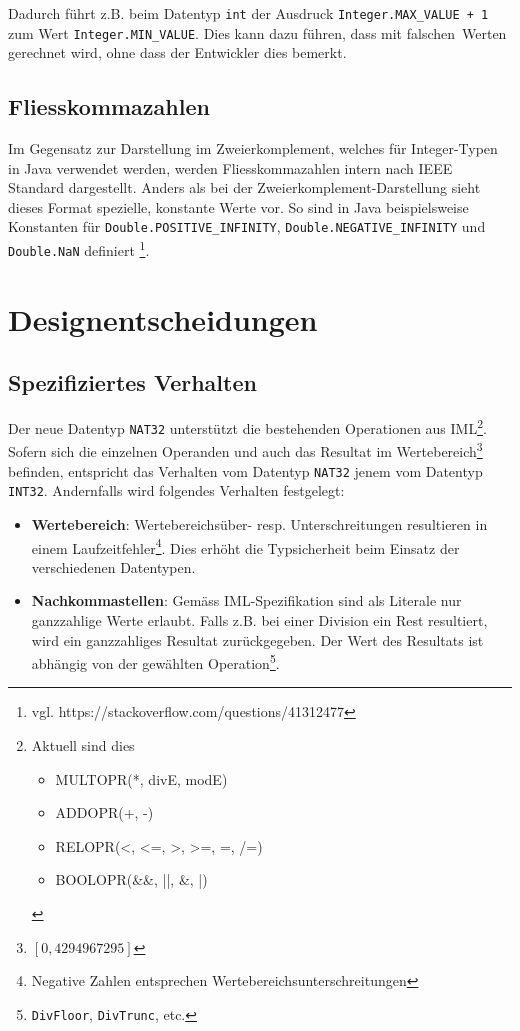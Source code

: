 \documentclass[10pt, a4paper, twocolumn]{article} %
\begin{document}
Dadurch führt z.B. beim Datentyp \texttt{int} der Ausdruck \texttt{Integer.MAX\_VALUE + 1} zum Wert \texttt{Integer.MIN\_VALUE}.
Dies kann dazu führen, dass mit \glqq falschen\grqq \ Werten gerechnet wird, ohne dass der Entwickler dies bemerkt.

\subsection{Fliesskommazahlen}
\label{ieee}
Im Gegensatz zur Darstellung im Zweierkomplement, welches für Integer-Typen in Java verwendet werden, werden Fliesskommazahlen intern nach IEEE Standard dargestellt.
Anders als bei der Zweierkomplement-Darstellung sieht dieses Format spezielle, konstante Werte vor.
So sind in Java beispielsweise Konstanten für \texttt{Double.POSITIVE\_INFINITY}, \texttt{Double.NEGATIVE\_INFINITY} und \texttt{Double.NaN} definiert \footnote{vgl. https://stackoverflow.com/questions/41312477}.

\section{Designentscheidungen}
\subsection{Spezifiziertes Verhalten}
Der neue Datentyp \texttt{NAT32} unterstützt die bestehenden Operationen aus IML\footnote{Aktuell sind dies \begin{itemize}
                                                                                                                \item MULTOPR(*, divE, modE) \item ADDOPR(+, -) \item RELOPR(<, <=, >, >=, =, /=) \item BOOLOPR(\&\&, ||, \&, |)
\end{itemize}}.
Sofern sich die einzelnen Operanden und auch das Resultat im Wertebereich\footnote{$[0,4294967295]$} befinden,
entspricht das Verhalten vom Datentyp \texttt{NAT32} jenem vom Datentyp \texttt{INT32}.
Andernfalls wird folgendes Verhalten festgelegt:

\begin{itemize}
    \item \textbf{Wertebereich}: Wertebereichsüber- resp. Unterschreitungen resultieren in einem Laufzeitfehler\footnote{Negative Zahlen entsprechen Wertebereichsunterschreitungen}. Dies erhöht die Typsicherheit beim Einsatz der verschiedenen Datentypen.
    \item \textbf{Nachkommastellen}: Gemäss IML-Spezifikation sind als Literale nur ganzzahlige Werte erlaubt. Falls z.B. bei einer Division ein Rest resultiert, wird ein ganzzahliges Resultat zurückgegeben. Der Wert des Resultats ist abhängig von der gewählten Operation\footnote{\texttt{DivFloor}, \texttt{DivTrunc}, etc.}.
\end{itemize}
\end{document}
